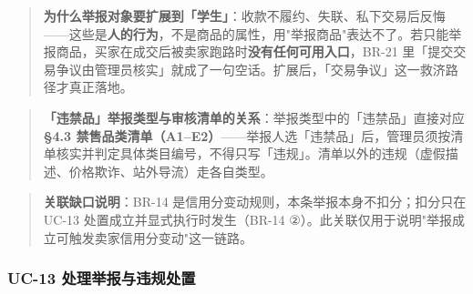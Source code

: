 \documentclass[12pt,a4paper]{ctexart}
\begin{document}
\begin{quote}\small
\textbf{为什么举报对象要扩展到「学生」}：收款不履约、失联、私下交易后反悔——这些是\textbf{人的行为}，不是商品的属性，用"举报商品"表达不了。若只能举报商品，买家在成交后被卖家跑路时\textbf{没有任何可用入口}，BR-21 里「提交交易争议由管理员核实」就成了一句空话。扩展后，「交易争议」这一救济路径才真正落地。

\end{quote}


\begin{quote}\small
\textbf{「违禁品」举报类型与审核清单的关系}：举报类型中的「违禁品」直接对应 \textbf{§4.3 禁售品类清单（A1–E2）}——举报人选「违禁品」后，管理员须按清单核实并判定具体类目编号，不得只写「违规」。清单以外的违规（虚假描述、价格欺诈、站外导流）走各自类型。

\end{quote}

\begin{quote}\small
\textbf{关联缺口说明}：BR-14 是信用分变动规则，本条举报本身不扣分；扣分只在 UC-13 处置成立并显式执行时发生（BR-14 ②）。此关联仅用于说明"举报成立可触发卖家信用分变动"这一链路。

\end{quote}

\subsubsection*{UC-13 处理举报与违规处置}
\end{document}

